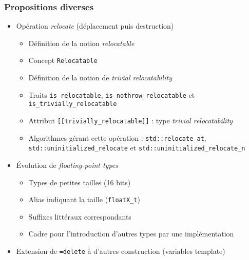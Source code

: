 \documentclass[C++.tex]{subfiles}
\begin{document}
\begin{frame}[fragile]
	\frametitle{Propositions diverses}
	\begin{itemize}
		\item Opération \og \textit{relocate}\fg{} (déplacement puis destruction)


		\begin{itemize}
			\item Définition de la notion \og \textit{relocatable}\fg{} 
			\item Concept \lstinline|Relocatable|


			\item Définition de la notion de \og \textit{trivial relocatability}\fg{}


			\item Traits \lstinline|is_relocatable|, \lstinline|is_nothrow_relocatable| et \lstinline|is_trivially_relocatable|
			\item Attribut \lstinline|[[trivially_relocatable]]| : type \textit{trivial relocatability}
			\item Algorithmes gérant cette opération : \lstinline|std::relocate_at|, \lstinline|std::uninitialized_relocate| et \lstinline|std::uninitialized_relocate_n|
		\end{itemize}

		\item Évolution de \textit{floating-point types}
		\begin{itemize}
			\item Types de petites tailles (16 bits)
			\item Alias indiquant la taille (\lstinline|floatX_t|)
			\item Suffixes littéraux correspondants
			\item Cadre pour l'introduction d'autres types par une implémentation
		\end{itemize}

		\item Extension de \lstinline|=delete| à d'autres construction (variables template)

	\end{itemize}
\end{frame}
\end{document}
